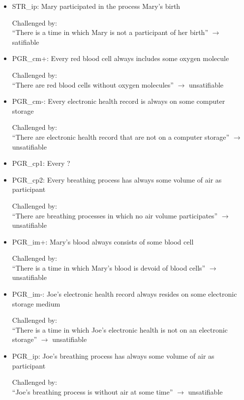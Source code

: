\begin{itemize}
\item STR\_ip:  Mary participated in the process Mary's birth

Challenged by: \\``There is a time in which Mary is not a participant of her birth''  $\rightarrow$ satifiable



\item PGR\_cm+: Every red blood cell always includes some oxygen molecule 

Challenged by: \\``There are red blood cells without oxygen molecules''  $\rightarrow$ unsatifiable


\item PGR\_cm-: Every electronic health record is always on some computer storage

Challenged by: \\``There are electronic health record that are not on a computer storage''  $\rightarrow$ unsatifiable


\item PGR\_cp1: Every ?  

\item PGR\_cp2: Every breathing process has always some volume of air as participant 

Challenged by: \\``There are breathing processes in which no air volume participates''  $\rightarrow$ unsatifiable


\item PGR\_im+: Mary's blood always consists of some blood cell 

Challenged by: \\``There is a time in which Mary's blood is devoid of blood cells''  $\rightarrow$ unsatifiable

\item PGR\_im-: Joe's electronic health record always resides on some electronic storage medium

Challenged by: \\``There is a time in which Joe's electronic health is not on an electronic storage''  $\rightarrow$ unsatifiable


\item PGR\_ip:  Joe's breathing process has always some volume of air as participant

Challenged by: \\``Joe's breathing process is without air at some time''  $\rightarrow$ unsatifiable


\end{itemize}
